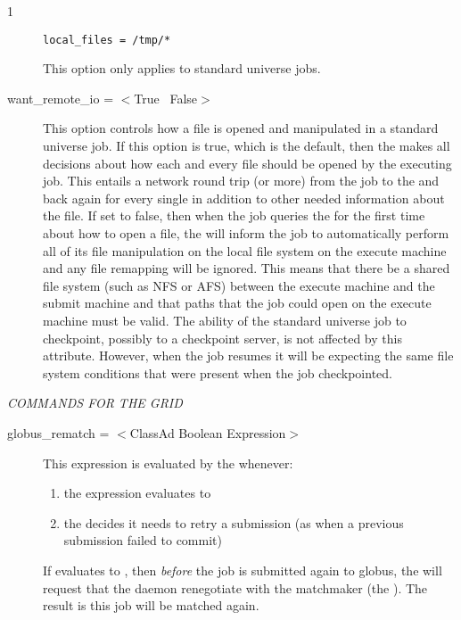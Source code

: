 \begin{ManPage}{\label{man-condor-submit}}{1}
\begin{description}
\begin{verbatim}
local_files = /tmp/*
\end{verbatim}

This option only applies to standard universe jobs.


\item[want\_remote\_io = $<$True \Bar\ False$>$]
This option controls how a file is opened and manipulated in a standard
universe job.
If this option is true, which is the default, then the 
makes all decisions about how each and every file should be opened by
the executing job.
This entails a network round trip (or more) from the job to the
 and back again for every single 
in addition to other needed information about the file.
If set to false, then when the job queries the  for the
first time about how to open a file, the  will inform the
job to automatically perform all of its file manipulation on the local
file system on the execute machine and any file remapping will be ignored.
This means that there  be a shared file system (such
as NFS or AFS) between the execute machine and the submit machine and that
 paths that the job could open on the execute machine must be valid.
The ability of the standard universe job to checkpoint, possibly to a
checkpoint server, is not affected by this attribute.
However, when the job resumes it will be expecting the same file system
conditions that were present when the job checkpointed.

\end{description} 

\emph{COMMANDS FOR THE GRID}
\begin{description} 


\item[globus\_rematch = $<$ClassAd Boolean Expression$>$]
This expression is evaluated by the  whenever:
\begin{enumerate}
\item
   the  expression evaluates to 
\item
   the  decides it needs to retry a submission
   (as when a previous submission failed to commit)
\end{enumerate}
If  evaluates to ,
then \emph{before} the job is submitted again to globus,
the  will request that the 
daemon renegotiate
with the matchmaker (the ).
The result is this job will be matched again.


\end{description}
\end{ManPage}
